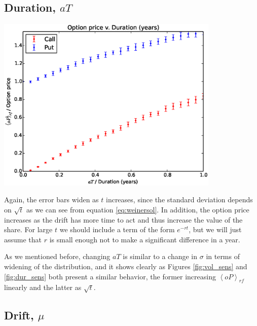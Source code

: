 \documentclass[8 pt]{article}
\newcommand{\avg}[1]{\left\langle #1 \right\rangle}
\newenvironment{Figure}
  {\par\medskip\noindent\minipage{\linewidth}}
  {\endminipage\par\medskip}
\begin{document}
\begin{multicols*}{2}
\vfill

\subsection{Duration, $aT$}

\begin{Figure}
  \begin{center}
    \includegraphics[width=0.8\textwidth]{graphs/oP_dur.eps}
    \label{fig:dur_sens}
  \end{center}
\end{Figure}

Again, the error bars widen as $t$ increases, since the standard deviation depends on $\sqrt{t}$ as we can see from equation \ref{eq:weinersol}. In addition, the option price increases as the drift has more time to act and thus increase the value of the share. For large $t$ we should include a term of the form $e^{-rt}$, but we will just assume that $r$ is small enough not to make a significant difference in a year.

As we mentioned before, changing $aT$ is similar to a change in $\sigma$ in terms of widening of the distribution, and it shows clearly as Figures \ref{fig:vol_sens} and \ref{fig:dur_sens} both present a similar behavior, the former increasing $\avg{oP}_{rf}$ linearly and the latter as $\sqrt{t}$.

\subsection{Drift, $\mu$}


\end{multicols*}
\end{document}
